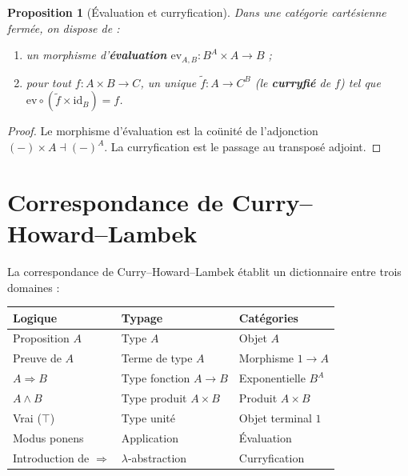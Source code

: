 \documentclass[a4paper,12pt]{book}
\newcommand{\id}{\mathrm{id}}
\newtheorem{proposition}[theoreme]{Proposition}
\begin{document}
\begin{proposition}[Évaluation et curryfication]\label{prop:eval-curry}
Dans une catégorie cartésienne fermée, on dispose de :
\begin{enumerate}[label=(\alph*)]
\item un morphisme d'\textbf{évaluation}
      $\mathrm{ev}_{A,B} \colon B^A \times A \to B$ ;
\item pour tout $f \colon A \times B \to C$, un unique
      $\tilde{f} \colon A \to C^B$ (le \textbf{curryfié} de $f$)
      tel que $\mathrm{ev} \circ (\tilde{f} \times \id_B) = f$.
\end{enumerate}
\end{proposition}

\begin{proof}
Le morphisme d'évaluation est la coünité de l'adjonction
$(-) \times A \dashv (-)^A$.  La curryfication est le passage au
transposé adjoint.
\end{proof}

\section{Correspondance de Curry--Howard--Lambek}\label{sec:curry-howard-lambek}


La correspondance de Curry--Howard--Lambek établit un dictionnaire
entre trois domaines :

\medskip
\begin{center}
\renewcommand{\arraystretch}{1.3}
\begin{tabular}{lll}
\toprule
\textbf{Logique} & \textbf{Typage} & \textbf{Catégories} \\
\midrule
Proposition $A$ & Type $A$ & Objet $A$ \\
Preuve de $A$ & Terme de type $A$ & Morphisme $1 \to A$ \\
$A \Rightarrow B$ & Type fonction $A \to B$ & Exponentielle $B^A$ \\
$A \wedge B$ & Type produit $A \times B$ & Produit $A \times B$ \\
Vrai ($\top$) & Type unité & Objet terminal $1$ \\
Modus ponens & Application & Évaluation \\
Introduction de $\Rightarrow$ & $\lambda$-abstraction & Curryfication \\
\bottomrule
\end{tabular}
\end{center}
\end{document}
